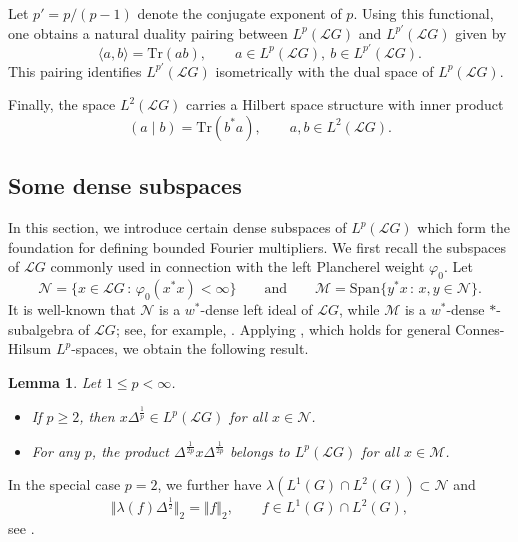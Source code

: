 \documentclass[12pt]{amsart}
\newcommand{\M}{\mbox{${\mathcal M}$}}
\newcommand{\N}{\mbox{${\mathcal N}$}}
\newcommand{\norm}[1]{\Vert#1\Vert}
\newtheorem{lemma}[theorem]{Lemma}
\theoremstyle{remark}
\theoremstyle{definition}
\numberwithin{equation}{section}
\begin{document}
Let $p' = p/(p-1)$ denote the conjugate exponent of $p$. Using this functional, one obtains a natural duality pairing between \(L^p({\mathcal L}G)\) and \(L^{p'}({\mathcal L}G)\) given by
\[
\langle a, b \rangle = \mathrm{Tr}(ab), \qquad 
a \in L^p({\mathcal L}G),\ b \in L^{p'}({\mathcal L}G).
\]
This pairing identifies \(L^{p'}({\mathcal L}G)\) isometrically with the dual space of \(L^p({\mathcal L}G)\).

Finally, the space $L^2({\mathcal L}G)$ carries a Hilbert space structure with inner product
\[
(a \mid b) = \mathrm{Tr}(b^* a), \qquad a,b \in L^2({\mathcal L}G).
\]
\smallskip
\subsection{Some dense subspaces}
In this section, we introduce certain dense subspaces of $L^p(\mathcal{L}G)$ which form the foundation for defining bounded Fourier multipliers. We first recall the subspaces of $\mathcal{L}G$ commonly used in connection with the left Plancherel weight $\varphi_0$. Let
\begin{equation}\label{3M}
\N = \{ x \in {\mathcal L}G \,:\, \varphi_0(x^*x) < \infty \}
\qquad\text{and}\qquad
\M = \mathrm{Span}\{ y^* x \,:\, x,y \in \N \}.
\end{equation}
It is well-known that $\N$ is a $w^*$-dense left ideal of ${\mathcal L}G$, while
$\M$ is a $w^*$-dense $*$-subalgebra of ${\mathcal L}G$; see, for example,
\cite[Section VII.1]{Tak2}.  Applying \cite[Theorem 26]{Terp1}, which holds for general Connes-Hilsum $L^p$-spaces, we obtain the following result.



\begin{lemma}\label{2Inc}
Let $1 \leq p < \infty$.
\begin{itemize}
\item[(1)] If $p \geq 2$, then $x \Delta^{\frac{1}{p}} \in L^p({\mathcal L}G)$ for all $x \in \N$.
\item[(2)] For any $p$, the product $\Delta^{\frac{1}{2p}} x \Delta^{\frac{1}{2p}}$ belongs to 
$L^p({\mathcal L}G)$ for all $x \in \M$.
\end{itemize}
\end{lemma}

In the special case $p = 2$, we further have 
$\lambda(L^1(G) \cap L^2(G)) \subset \N$ and
\begin{equation}\label{2FP}
\norm{\lambda(f)\Delta^{\frac12}}_2 = \norm{f}_2, \qquad 
f \in L^1(G) \cap L^2(G),
\end{equation}
see \cite[Theorem 3.2]{Terp2}.
\end{document}
